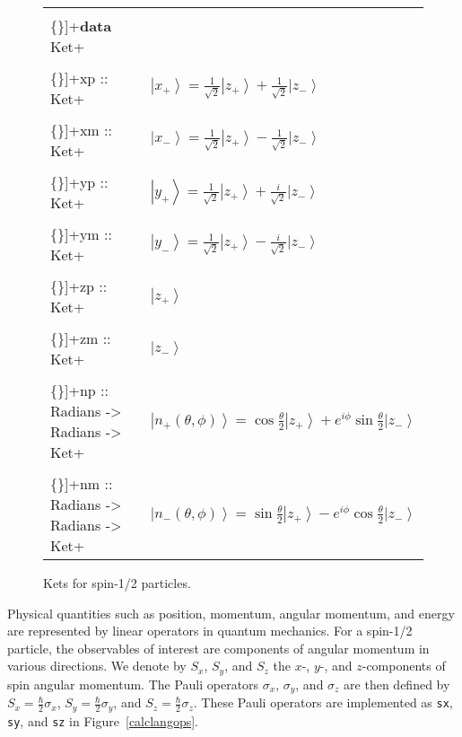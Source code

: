 \documentclass[12pt]{article}
\newcommand{\VERB}{\Verb[commandchars=\\\{\}]}
\newcommand{\KeywordTok}[1]{\textcolor[rgb]{0.00,0.44,0.13}{\textbf{{#1}}}}
\newcommand{\DataTypeTok}[1]{\textcolor[rgb]{0.56,0.13,0.00}{{#1}}}
\newcommand{\SpecialCharTok}[1]{\textcolor[rgb]{0.25,0.44,0.63}{{#1}}}
\newcommand{\FunctionTok}[1]{\textcolor[rgb]{0.02,0.16,0.49}{{#1}}}
\newcommand{\ket}[1]{\left| #1 \right\rangle}
\begin{document}
\begin{figure}
\begin{tabular}{ll}
\VERB+\KeywordTok{data} \DataTypeTok{Ket}+ \\
\VERB+\FunctionTok{xp} \SpecialCharTok{::} \DataTypeTok{Ket}+ & $\ket{x_+} = \frac{1}{\sqrt{2}} \ket{z_+} + \frac{1}{\sqrt{2}} \ket{z_-}$ \\
\VERB+\FunctionTok{xm} \SpecialCharTok{::} \DataTypeTok{Ket}+ & $\ket{x_-} = \frac{1}{\sqrt{2}} \ket{z_+} - \frac{1}{\sqrt{2}} \ket{z_-}$ \\
\VERB+\FunctionTok{yp} \SpecialCharTok{::} \DataTypeTok{Ket}+ & $\ket{y_+} = \frac{1}{\sqrt{2}} \ket{z_+} + \frac{i}{\sqrt{2}} \ket{z_-}$ \\
\VERB+\FunctionTok{ym} \SpecialCharTok{::} \DataTypeTok{Ket}+ & $\ket{y_-} = \frac{1}{\sqrt{2}} \ket{z_+} - \frac{i}{\sqrt{2}} \ket{z_-}$ \\
\VERB+\FunctionTok{zp} \SpecialCharTok{::} \DataTypeTok{Ket}+ & $\ket{z_+}$ \\
\VERB+\FunctionTok{zm} \SpecialCharTok{::} \DataTypeTok{Ket}+ & $\ket{z_-}$ \\
\VERB+\FunctionTok{np} \SpecialCharTok{::} \DataTypeTok{Radians} \SpecialCharTok{->} \DataTypeTok{Radians} \SpecialCharTok{->} \DataTypeTok{Ket}+ & $\ket{n_+(\theta,\phi)} = \cos \frac{\theta}{2} \ket{z_+} + e^{i \phi} \sin \frac{\theta}{2} \ket{z_-}$ \\
\VERB+\FunctionTok{nm} \SpecialCharTok{::} \DataTypeTok{Radians} \SpecialCharTok{->} \DataTypeTok{Radians} \SpecialCharTok{->} \DataTypeTok{Ket}+ & $\ket{n_-(\theta,\phi)} = \sin \frac{\theta}{2} \ket{z_+} - e^{i \phi} \cos \frac{\theta}{2} \ket{z_-}$
\end{tabular}
\caption{Kets for spin-1/2 particles.}
\label{calclangkets}
\end{figure}

Physical quantities
such as position, momentum, angular momentum, and energy
are represented by linear operators in quantum mechanics.
For a spin-1/2 particle, the observables of interest are
components of angular momentum in various directions.
We denote by $S_x$, $S_y$, and $S_z$ the $x$-, $y$-, and
$z$-components of spin angular momentum.
The Pauli operators $\sigma_x$, $\sigma_y$, and $\sigma_z$
are then defined by $S_x = \frac{\hbar}{2} \sigma_x$,
$S_y = \frac{\hbar}{2} \sigma_y$, and
$S_z = \frac{\hbar}{2} \sigma_z$.
These Pauli operators are implemented as
\FunctionTok{\texttt{sx}},
\FunctionTok{\texttt{sy}}, and
\FunctionTok{\texttt{sz}} in Figure~\ref{calclangops}.
\end{document}
